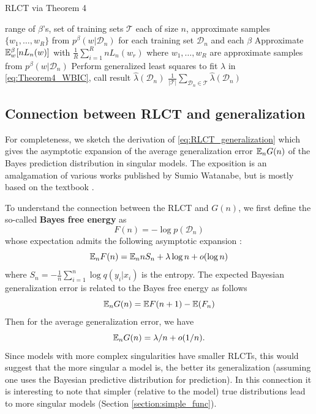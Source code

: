 \documentclass{article} %
\begin{document}
\begin{algorithm}[tb]
	\caption{RLCT via Theorem 4}
	\label{alg:thm4}
	\begin{algorithmic}
		 range of $\beta$'s, set of training sets $\mathcal T$ each of size $n$, approximate samples $\{w_1,\ldots,w_R\}$ from $p^\beta(w|\mathcal D_n)$ for each training set $\mathcal D_n$ and each $\beta$
        		\STATE Approximate ${\mathbb{E}}_w^\beta [nL_n(w)]$ with $\frac{1}{R} \sum_{i=1}^R nL_n(w_r)$ where $w_1,\ldots,w_R$ are approximate samples from $p^\beta(w|\mathcal D_n)$
    		\ENDFOR
    		\STATE Perform generalized least squares to fit $\lambda$ in \eqref{eq:Theorem4_WBIC}, call result $\hat \lambda(\mathcal D_n)$
		\ENDFOR
		 $\frac{1}{|\mathcal T|} \sum_{\mathcal D_n \in \mathcal T} \hat \lambda(\mathcal D_n)$
	\end{algorithmic}
\end{algorithm}



\subsection{Connection between RLCT and generalization} \label{appendix:generalization_theory}
For completeness, we sketch the derivation of \eqref{eq:RLCT_generalization} which gives the asymptotic expansion of the average generalization error ${\mathbb{E}}_n G(n)$ of the Bayes prediction distribution  in singular models. The exposition is an amalgamation of various works published by Sumio Watanabe, but is mostly based on the textbook \cite{watanabe_algebraic_2009}. 

To understand the connection between the RLCT and $G(n)$, we first define the so-called \textbf{Bayes free energy} as 
\[
F(n) = -\log p(\mathcal D_n)
\]
whose expectation admits the following asymptotic expansion \cite{watanabe_algebraic_2009}:
\[
{\mathbb{E}}_n F(n) =  {\mathbb{E}}_n n S_n + \lambda \log n + o(\log n)
\]
where $S_n = -\frac{1}{n} \sum_{i=1}^n \log q(y_i|x_i)$ is the entropy. 
The expected Bayesian generalization error is related to the Bayes free energy as follows
\[
{\mathbb{E}}_n G(n) = \mathbb{E} F(n+1) - \mathbb{E}(F_n)
\]
Then for the average generalization error, we have
\begin{equation}
{\mathbb{E}}_n G(n) = \lambda/n + o(1/n).
\label{eq:bayesgenerr}
\end{equation}
Since models with more complex singularities have smaller RLCTs, this would suggest that the more singular a model is, the better its generalization (assuming one uses the Bayesian predictive distribution for prediction). In this connection it is interesting to note that simpler (relative to the model) true distributions lead to more singular models (Section \ref{section:simple_func}).
\end{document}
